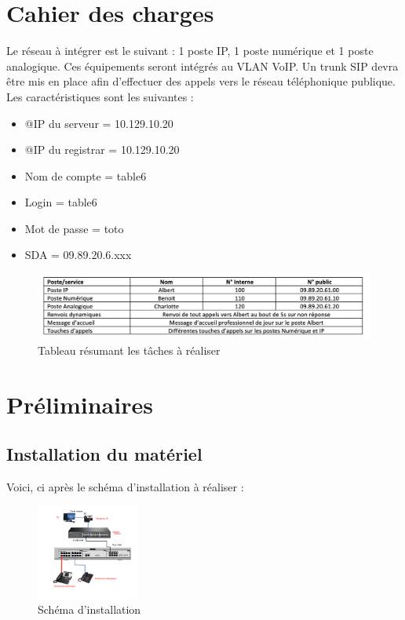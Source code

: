 \documentclass[12pt, a4paper]{article}
\begin{document}
\newpage
\section{Cahier des charges}

Le réseau à intégrer est le suivant : 1 poste IP, 1 poste numérique et 1 poste analogique.
Ces équipements seront intégrés au VLAN VoIP.
Un trunk SIP devra être mis en place afin d’effectuer des appels vers le réseau téléphonique publique.
Les caractéristiques sont les suivantes :\\

	\begin{itemize}
		\item @IP du serveur = 10.129.10.20
		\item @IP du registrar = 10.129.10.20
		\item Nom de compte = table6
		\item Login = table6
		\item Mot de passe = toto
		\item SDA = 09.89.20.6.xxx
	\end{itemize}

	\begin{figure}[H]
		\centering
		\includegraphics[width=1\textwidth]{img/tableau.png}
		\caption{Tableau résumant les tâches à réaliser}
		\label{fig:ch}
	\end{figure}

\section{Préliminaires}

	\subsection{Installation du matériel}

	Voici, ci après le schéma d'installation à réaliser :
	\begin{figure}[H]
		\centering
		\includegraphics[width=0.3\textwidth]{img/schema.png}
		\caption{Schéma d'installation}
		\label{fig:sh}
	\end{figure}
	
\end{document}
